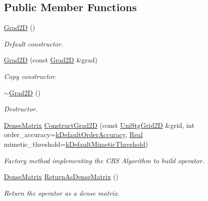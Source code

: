 \subsection*{Public Member Functions}
\begin{DoxyCompactItemize}
\item 
\hyperlink{classmtk_1_1Grad2D_a15bdca254b7bf662913b34c7afb8d4c9}{Grad2\-D} ()
\begin{DoxyCompactList}\small\item\em Default constructor. \end{DoxyCompactList}\item 
\hyperlink{classmtk_1_1Grad2D_a31ccf118edb128c85f28b579bd9394a8}{Grad2\-D} (const \hyperlink{classmtk_1_1Grad2D}{Grad2\-D} \&grad)
\begin{DoxyCompactList}\small\item\em Copy constructor. \end{DoxyCompactList}\item 
\hyperlink{classmtk_1_1Grad2D_ae6a071b24422d057c41346e80be96cb3}{$\sim$\-Grad2\-D} ()
\begin{DoxyCompactList}\small\item\em Destructor. \end{DoxyCompactList}\item 
\hyperlink{classmtk_1_1DenseMatrix}{Dense\-Matrix} \hyperlink{classmtk_1_1Grad2D_a54968910cecdd7d313a5b87356d2799f}{Construct\-Grad2\-D} (const \hyperlink{classmtk_1_1UniStgGrid2D}{Uni\-Stg\-Grid2\-D} \&grid, int order\-\_\-accuracy=\hyperlink{group__c01-roots_ga0d95560098eb36420511103637b6952f}{k\-Default\-Order\-Accuracy}, \hyperlink{group__c01-roots_gac080bbbf5cbb5502c9f00405f894857d}{Real} mimetic\-\_\-threshold=\hyperlink{group__c01-roots_ga35718d949bdc81a08a9cc8ebbe3478a2}{k\-Default\-Mimetic\-Threshold})
\begin{DoxyCompactList}\small\item\em Factory method implementing the C\-B\-S Algorithm to build operator. \end{DoxyCompactList}\item 
\hyperlink{classmtk_1_1DenseMatrix}{Dense\-Matrix} \hyperlink{classmtk_1_1Grad2D_afa14fa1b84f05752027c1cef66381de8}{Return\-As\-Dense\-Matrix} ()
\begin{DoxyCompactList}\small\item\em Return the operator as a dense matrix. \end{DoxyCompactList}\end{DoxyCompactItemize}
